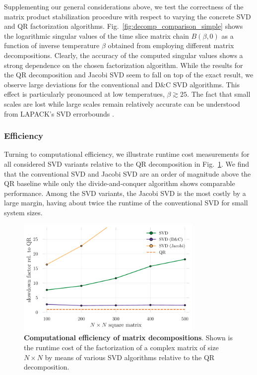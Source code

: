 \documentclass[submission, Phys]{SciPost}
\begin{document}
Supplementing our general considerations above, we test the correctness of the matrix product stabilization procedure with respect to varying the concrete SVD and QR factorization algorithms. Fig.~\ref{fig:decomp_comparison_simple} shows the logarithmic singular values of the time slice matrix chain $B(\beta, 0)$ as a function of inverse temperature $\beta$ obtained from employing different matrix decompositions. Clearly, the accuracy of the computed singular values shows a strong dependence on the chosen factorization algorithm. While the results for the QR decomposition and Jacobi SVD seem to fall on top of the exact result, we observe large deviations for the conventional and D\&C SVD algorithms. This effect is particularly pronounced at low temperatues, $\beta \gtrsim 25$. The fact that small scales are lost while large scales remain relatively accurate can be understood from LAPACK's SVD errorbounds \cite{errorbounds}.

\subsubsection{Efficiency}
Turning to computational efficiency, we illustrate runtime cost measurements for all considered SVD variants relative to the QR decomposition in Fig.~\ref{fig:benchmark_decomps}. We find that the conventional SVD and Jacobi SVD are an order of magnitude above the QR baseline while only the divide-and-conquer algorithm shows comparable performance. Among the SVD variants, the Jacobi SVD is the most costly by a large margin, having about twice the runtime of the conventional SVD for small system sizes.

\begin{figure}
	\centering
	\includegraphics[width=0.8\textwidth]{figures/benchmark_decomps.pdf}
	\caption{\textbf{Computational efficiency of matrix decompositions}. Shown is the runtime cost of the factorization of a complex matrix of size $N \times N$ by means of various SVD algorithms relative to the QR decomposition. \label{fig:benchmark_decomps}}
\end{figure}
\end{document}
